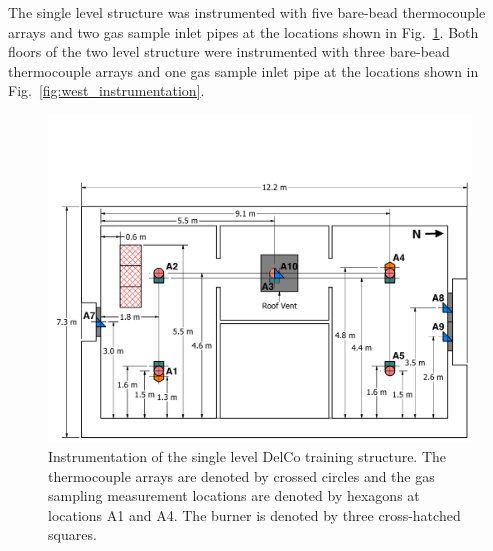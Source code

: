 The single level structure was instrumented with five bare-bead thermocouple arrays and two gas sample inlet pipes at the locations shown in Fig.~\ref{fig:east_instrumentation}. Both floors of the two level structure were instrumented with three bare-bead thermocouple arrays and one gas sample inlet pipe at the locations shown in Fig.~\ref{fig:west_instrumentation}.

\begin{figure}[!ht]
\includegraphics[width=\columnwidth]{FIGURES/DelCo_Trainers/East_Structure_Dimensioned_Instrumentation}
\caption[Instrumentation of the single level DelCo training structure]{Instrumentation of the single level DelCo training structure. The thermocouple arrays are denoted by crossed circles and the gas sampling measurement locations are denoted by hexagons at locations A1 and A4. The burner is denoted by three cross-hatched squares.}
\label{fig:east_instrumentation}
\end{figure}

